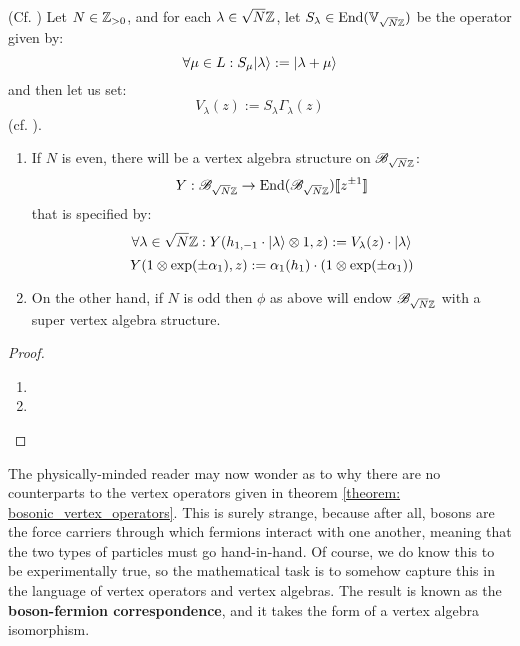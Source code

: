         \begin{theorem} \label{theorem: rank_1_bosonic_vertex_operators}
            (Cf. \cite[Proposition 5.2.5]{frenkel_ben_zvi_vertex_algebras_and_algebraic_curves}) Let $N \in \mathbb{Z}_{> 0}$, and for each $\lambda \in \sqrt{N} \mathbb{Z}$, let $S_{\lambda} \in \mathrm{End}(\mathbb{V}_{\sqrt{N} \mathbb{Z}})$ be the operator given by:
                $$\forall \mu \in L: S_{\mu} \lvert {\lambda} \rangle := \lvert {\lambda + \mu} \rangle$$
            and then let us set:
                $$V_{\lambda}(z) := S_{\lambda} \Gamma_{\lambda}(z)$$
            (cf. \cite[Equation 5.2.8, p. 83]{frenkel_ben_zvi_vertex_algebras_and_algebraic_curves}).
            \begin{enumerate}
                \item If $N$ is even, there will be a vertex algebra structure on $\mathscr{B}_{\sqrt{N} \mathbb{Z}}$:
                    $$Y: \mathscr{B}_{\sqrt{N} \mathbb{Z}} \to \mathrm{End}(\mathscr{B}_{\sqrt{N} \mathbb{Z}})[\![z^{\pm 1}]\!]$$
                that is specified by:
                    $$\forall \lambda \in \sqrt{N} \Z: Y(h_{1, -1} \cdot \ket{\lambda} \tensor 1, z) := V_{\lambda}(z) \cdot \ket{\lambda}$$
                    $$Y( 1 \tensor \exp(\pm \alpha_1), z ) := \alpha_1(h_1) \cdot (1 \tensor \exp(\pm \alpha_1))$$
                \item On the other hand, if $N$ is odd then $\phi$ as above will endow $\mathscr{B}_{\sqrt{N} \mathbb{Z}}$ with a super vertex algebra structure.
            \end{enumerate}
        \end{theorem}
            \begin{proof}
                \begin{enumerate}
                    \item 
                    \item 
                \end{enumerate}
            \end{proof}

        The physically-minded reader may now wonder as to why there are no  counterparts to the vertex operators given in theorem \ref{theorem: bosonic_vertex_operators}. This is surely strange, because after all, bosons are the force carriers through which fermions interact with one another, meaning that the two types of particles must go hand-in-hand. Of course, we do know this to be experimentally true, so the mathematical task is to somehow capture this in the language of vertex operators and vertex algebras. The result is known as the \textbf{boson-fermion correspondence}, and it takes the form of a vertex algebra isomorphism.

